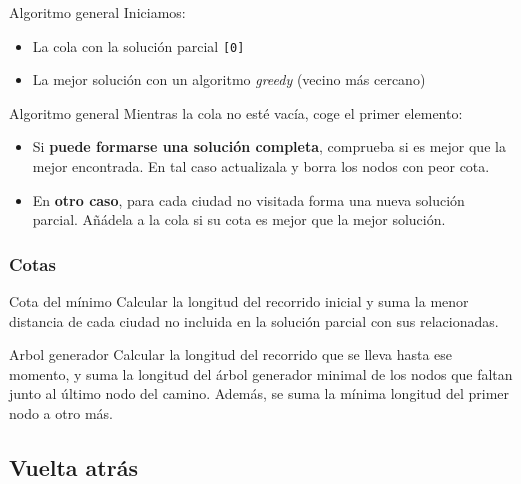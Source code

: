 \begin{frame}{Algoritmo general}
  Iniciamos:
  \begin{itemize}
    \item La cola con la solución parcial \texttt{[0]}
    \item La mejor solución con un algoritmo \textit{greedy} (vecino más cercano)
  \end{itemize}
\end{frame}

\begin{frame}{Algoritmo general}
  Mientras la cola no esté vacía, coge el primer elemento:
  \begin{itemize}
    \item Si \textbf{puede formarse una solución completa}, comprueba si es mejor que la mejor encontrada. En tal caso actualizala y borra los nodos con peor cota.
    \item En \textbf{otro caso}, para cada ciudad no visitada forma una nueva solución parcial. Añádela a la cola si su cota es mejor que la mejor solución.
  \end{itemize}
\end{frame}

\subsubsection{Cotas}

\begin{frame}{Cota del mínimo}
  Calcular la longitud del recorrido inicial y suma la menor distancia de cada ciudad no incluida en la solución parcial con sus relacionadas.
\end{frame}

\begin{frame}{Arbol generador}
  Calcular la longitud del recorrido que se lleva hasta ese momento, y suma la longitud del árbol generador minimal de los nodos que faltan junto al último nodo del camino. Además, se suma la mínima longitud del primer nodo a otro más.

\end{frame}

\subsection{Vuelta atrás}


